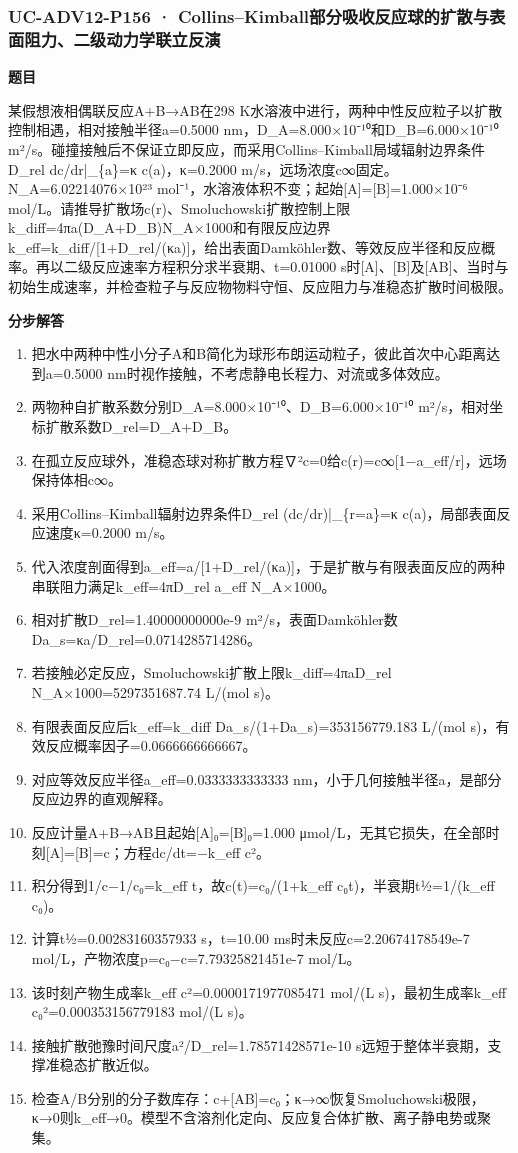 \documentclass[UTF8,11pt,a4paper]{ctexart}
\begin{document}
\subsubsection*{UC-ADV12-P156 · Collins–Kimball部分吸收反应球的扩散与表面阻力、二级动力学联立反演}
\noindent\textbf{题目}\par
某假想液相偶联反应A+B→AB在298 K水溶液中进行，两种中性反应粒子以扩散控制相遇，相对接触半径a=0.5000 nm，D\_A=8.000×10⁻¹⁰和D\_B=6.000×10⁻¹⁰ m²/s。碰撞接触后不保证立即反应，而采用Collins–Kimball局域辐射边界条件D\_rel dc/dr|\_\{a\}=κ c(a)，κ=0.2000 m/s，远场浓度c∞固定。N\_A=6.02214076×10²³ mol⁻¹，水溶液体积不变；起始[A]=[B]=1.000×10⁻⁶ mol/L。请推导扩散场c(r)、Smoluchowski扩散控制上限k\_diff=4πa(D\_A+D\_B)N\_A×1000和有限反应边界k\_eff=k\_diff/[1+D\_rel/(κa)]，给出表面Damköhler数、等效反应半径和反应概率。再以二级反应速率方程积分求半衰期、t=0.01000 s时[A]、[B]及[AB]、当时与初始生成速率，并检查粒子与反应物物料守恒、反应阻力与准稳态扩散时间极限。\par
\medskip\noindent\textbf{分步解答}
\begin{enumerate}
\item 把水中两种中性小分子A和B简化为球形布朗运动粒子，彼此首次中心距离达到a=0.5000 nm时视作接触，不考虑静电长程力、对流或多体效应。
\item 两物种自扩散系数分别D\_A=8.000×10⁻¹⁰、D\_B=6.000×10⁻¹⁰ m²/s，相对坐标扩散系数D\_rel=D\_A+D\_B。
\item 在孤立反应球外，准稳态球对称扩散方程∇²c=0给c(r)=c∞[1−a\_eff/r]，远场保持体相c∞。
\item 采用Collins–Kimball辐射边界条件D\_rel (dc/dr)|\_\{r=a\}=κ c(a)，局部表面反应速度κ=0.2000 m/s。
\item 代入浓度剖面得到a\_eff=a/[1+D\_rel/(κa)]，于是扩散与有限表面反应的两种串联阻力满足k\_eff=4πD\_rel a\_eff N\_A×1000。
\item 相对扩散D\_rel=1.40000000000e-9 m²/s，表面Damköhler数Da\_s=κa/D\_rel=0.0714285714286。
\item 若接触必定反应，Smoluchowski扩散上限k\_diff=4πaD\_rel N\_A×1000=5297351687.74 L/(mol s)。
\item 有限表面反应后k\_eff=k\_diff Da\_s/(1+Da\_s)=353156779.183 L/(mol s)，有效反应概率因子=0.0666666666667。
\item 对应等效反应半径a\_eff=0.0333333333333 nm，小于几何接触半径a，是部分反应边界的直观解释。
\item 反应计量A+B→AB且起始[A]₀=[B]₀=1.000 μmol/L，无其它损失，在全部时刻[A]=[B]=c；方程dc/dt=−k\_eff c²。
\item 积分得到1/c−1/c₀=k\_eff t，故c(t)=c₀/(1+k\_eff c₀t)，半衰期t½=1/(k\_eff c₀)。
\item 计算t½=0.00283160357933 s，t=10.00 ms时未反应c=2.20674178549e-7 mol/L，产物浓度p=c₀−c=7.79325821451e-7 mol/L。
\item 该时刻产物生成率k\_eff c²=0.0000171977085471 mol/(L s)，最初生成率k\_eff c₀²=0.000353156779183 mol/(L s)。
\item 接触扩散弛豫时间尺度a²/D\_rel=1.78571428571e-10 s远短于整体半衰期，支撑准稳态扩散近似。
\item 检查A/B分别的分子数库存：c+[AB]=c₀；κ→∞恢复Smoluchowski极限，κ→0则k\_eff→0。模型不含溶剂化定向、反应复合体扩散、离子静电势或聚集。
\end{enumerate}
\end{document}
